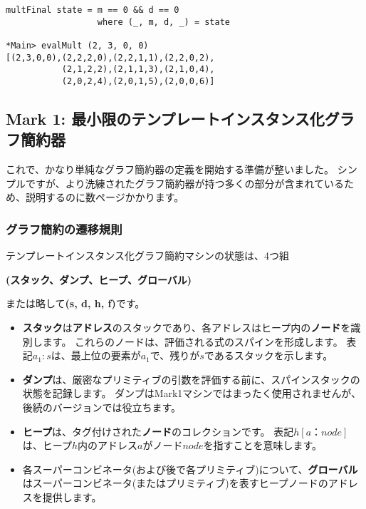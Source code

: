 \documentclass{jarticle}
\begin{document}
\begin{verbatim}
multFinal state = m == 0 && d == 0
                  where (_, m, d, _) = state

*Main> evalMult (2, 3, 0, 0)
[(2,3,0,0),(2,2,2,0),(2,2,1,1),(2,2,0,2),
           (2,1,2,2),(2,1,1,3),(2,1,0,4),
           (2,0,2,4),(2,0,1,5),(2,0,0,6)]
\end{verbatim}
\newpage

\subsection{Mark 1: 最小限のテンプレートインスタンス化グラフ簡約器}

これで、かなり単純なグラフ簡約器の定義を開始する準備が整いました。
シンプルですが、より洗練されたグラフ簡約器が持つ多くの部分が含まれているため、説明するのに数ページかかります。

\subsubsection{グラフ簡約の遷移規則}

テンプレートインスタンス化グラフ簡約マシンの状態は、4つ組

\begin{center}
	\textbf{(スタック、ダンプ、ヒープ、グローバル)}
\end{center}

または略して\textbf{(s, d, h, f)}です。

\begin{itemize}
	\item \textbf{スタック}は\textbf{アドレス}のスタックであり、各アドレスはヒープ内の\textbf{ノード}を識別します。
	      これらのノードは、評価される式のスパインを形成します。 表記$a_1 : s$は、最上位の要素が$a_1$で、残りが$s$であるスタックを示します。
	\item \textbf{ダンプ}は、厳密なプリミティブの引数を評価する前に、スパインスタックの状態を記録します。
	      ダンプはMark1マシンではまったく使用されませんが、後続のバージョンでは役立ちます。
	\item \textbf{ヒープ}は、タグ付けされた\textbf{ノード}のコレクションです。
	      表記$h [a：node]$は、ヒープ$h$内のアドレス$a$がノード$node$を指すことを意味します。
	\item 各スーパーコンビネータ(および後で各プリミティブ)について、\textbf{グローバル}はスーパーコンビネータ(またはプリミティブ)を表すヒープノードのアドレスを提供します。
\end{itemize}
\end{document}
